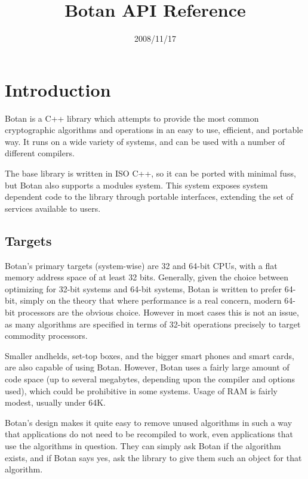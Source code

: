 \documentclass{article}
\title{\textbf{Botan API Reference}}
\author{}
\date{2008/11/17}
\begin{document}
\maketitle

\tableofcontents

\parskip=5pt

\pagebreak
\section{Introduction}

Botan is a C++ library which attempts to provide the most common
cryptographic algorithms and operations in an easy to use, efficient,
and portable way. It runs on a wide variety of systems, and can be
used with a number of different compilers.

The base library is written in ISO C++, so it can be ported with
minimal fuss, but Botan also supports a modules system. This system
exposes system dependent code to the library through portable
interfaces, extending the set of services available to users.

\subsection{Targets}

Botan's primary targets (system-wise) are 32 and 64-bit CPUs, with a
flat memory address space of at least 32 bits. Generally, given the
choice between optimizing for 32-bit systems and 64-bit systems, Botan
is written to prefer 64-bit, simply on the theory that where
performance is a real concern, modern 64-bit processors are the
obvious choice. However in most cases this is not an issue, as many
algorithms are specified in terms of 32-bit operations precisely to
target commodity processors.

Smaller andhelds, set-top boxes, and the bigger smart phones and smart
cards, are also capable of using Botan. However, Botan uses a fairly
large amount of code space (up to several megabytes, depending upon
the compiler and options used), which could be prohibitive in some
systems. Usage of RAM is fairly modest, usually under 64K.

Botan's design makes it quite easy to remove unused algorithms in such
a way that applications do not need to be recompiled to work, even
applications that use the algorithms in question. They can simply ask
Botan if the algorithm exists, and if Botan says yes, ask the library
to give them such an object for that algorithm.
\end{document}
